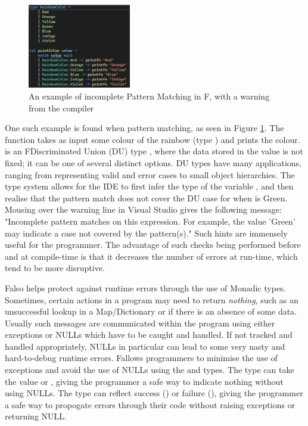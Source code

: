 \begin{figure} 
  \begin{center}
    \includegraphics[width=0.40\textwidth]{02.Background/patternmatch.png}
  \end{center}
  \caption{An example of incomplete Pattern Matching in F\fsharp, with a warning from the compiler}
  \label{fig:patternmatch}
\end{figure}

One such example is found when pattern matching, as seen in Figure \ref{fig:patternmatch}. The function  takes as input some colour of the rainbow (type ) and prints the colour.  is an F\fsharp Discriminated Union (DU) type \cite{dutypes}, where the data stored in the value is not fixed; it can be one of several distinct options. DU types have many applications, ranging from representing valid and error cases to small object hierarchies.  The type system allows for the IDE to first infer the type of the variable , and then realise that the pattern match does not cover the DU case for when  is Green. Mousing over the warning line in Visual Studio gives the following message: "Incomplete pattern matches on this expression. For example, the value 'Green' may indicate a case not covered by the pattern(s)." Such hints are immensely useful for the programmer. The advantage of such checks being performed before and at compile-time is that it decreases the number of errors at run-time, which tend to be more disruptive.

F\fsharp also helps protect against runtime errors through the use of Monadic types. Sometimes, certain actions in a program may need to return \textit{nothing}, such as an unsuccessful lookup in a Map/Dictionary or if there is an absence of some data. Usually such messages are communicated within the program using either exceptions or NULLs which have to be caught and handled. If not tracked and handled appropriately, NULLs in particular can lead to some very nasty and hard-to-debug runtime errors. F\fsharp allows programmers to minimise the use of exceptions and avoid the use of NULLs using the  and  types. The  type can take the value  or , giving the programmer a safe way to indicate nothing without using NULLs. The  type can reflect success () or failure (), giving the programmer a safe way to propogate errors through their code without raising exceptions or returning NULL. 

